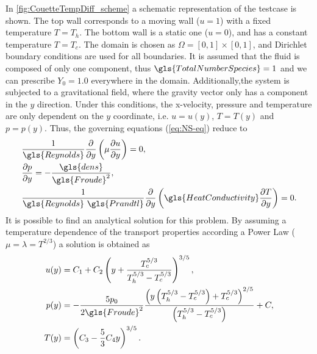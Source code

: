 In \cref{fig:CouetteTempDiff_scheme} a schematic representation of the testcase is shown. The top wall corresponds to a moving wall ($u = 1$) with a fixed temperature $T=T_h$. The bottom wall is a static one ($u = 0$), and has a constant temperature $T = T_c$. 
The domain is chosen as $\Omega = [0,1]\times[0,1]$, and Dirichlet boundary conditions are used for all boundaries. It is assumed that the fluid is composed of only one component, thus $\gls{TotalNumberSpecies} = 1$ and we can prescribe $Y_0 = 1.0$ everywhere in the domain. Additionally,the system is subjected to a gravitational field, where the gravity vector only has a component in the $y$ direction. Under this conditions, the x-velocity, pressure and temperature are only dependent on the $y$ coordinate, i.e. $u = u(y)$, $T = T(y)$ and $p = p(y)$. Thus, the governing equations (\cref{eq:NS-eq}) reduce to 
\begin{align}
&\frac{1}{\gls{Reynolds}} \pfrac{ }{y}\left(\mu\pfrac{u}{y}\right) = 0,\\
&\pfrac{p}{y} = -\frac{\gls{dens}}{\gls{Froude}^2},\\
&\frac{1}{\gls{Reynolds}~\gls{Prandtl}} \pfrac{ }{y}\left(\gls{HeatConductivity}\pfrac{T}{y}\right) = 0.
\end{align}
It is possible to find an analytical solution for this problem.
By assuming a temperature dependence of the transport properties according a Power Law ($\mu = \lambda = T^{2/3}$) a solution is obtained as 
\begin{align}
u(y) &= C_1 + C_2\left(y + \frac{T_c^{5/3}}{T_h^{5/3}-T_c^{5/3}} \right)^{3/5},\label{eq:CouetteU}\\
p(y) &= -\frac{5p_0}{2\gls{Froude}^2}\frac{\left(y\left(T_h^{5/3}-T_c^{5/3}\right)+T_c^{5/3}\right)^{2/5}}{\left(T_h^{5/3}-T_c^{5/3}\right)}+C,\label{eq:Couettep}\\
T(y) &= \left(C_3 - \frac{5}{3}C_4 y\right)^{3/5}\label{eq:CouetteT}.
\end{align} 
